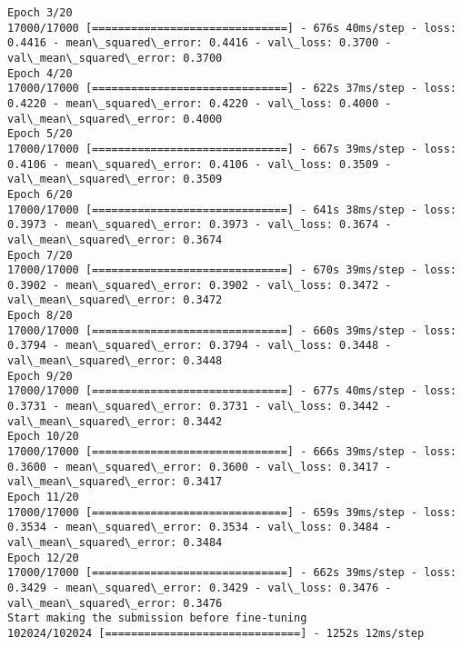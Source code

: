 \documentclass[11pt]{article}
\begin{document}
\begin{Verbatim}[commandchars=\\\{\}]
Epoch 3/20
17000/17000 [==============================] - 676s 40ms/step - loss: 0.4416 - mean\_squared\_error: 0.4416 - val\_loss: 0.3700 - val\_mean\_squared\_error: 0.3700
Epoch 4/20
17000/17000 [==============================] - 622s 37ms/step - loss: 0.4220 - mean\_squared\_error: 0.4220 - val\_loss: 0.4000 - val\_mean\_squared\_error: 0.4000
Epoch 5/20
17000/17000 [==============================] - 667s 39ms/step - loss: 0.4106 - mean\_squared\_error: 0.4106 - val\_loss: 0.3509 - val\_mean\_squared\_error: 0.3509
Epoch 6/20
17000/17000 [==============================] - 641s 38ms/step - loss: 0.3973 - mean\_squared\_error: 0.3973 - val\_loss: 0.3674 - val\_mean\_squared\_error: 0.3674
Epoch 7/20
17000/17000 [==============================] - 670s 39ms/step - loss: 0.3902 - mean\_squared\_error: 0.3902 - val\_loss: 0.3472 - val\_mean\_squared\_error: 0.3472
Epoch 8/20
17000/17000 [==============================] - 660s 39ms/step - loss: 0.3794 - mean\_squared\_error: 0.3794 - val\_loss: 0.3448 - val\_mean\_squared\_error: 0.3448
Epoch 9/20
17000/17000 [==============================] - 677s 40ms/step - loss: 0.3731 - mean\_squared\_error: 0.3731 - val\_loss: 0.3442 - val\_mean\_squared\_error: 0.3442
Epoch 10/20
17000/17000 [==============================] - 666s 39ms/step - loss: 0.3600 - mean\_squared\_error: 0.3600 - val\_loss: 0.3417 - val\_mean\_squared\_error: 0.3417
Epoch 11/20
17000/17000 [==============================] - 659s 39ms/step - loss: 0.3534 - mean\_squared\_error: 0.3534 - val\_loss: 0.3484 - val\_mean\_squared\_error: 0.3484
Epoch 12/20
17000/17000 [==============================] - 662s 39ms/step - loss: 0.3429 - mean\_squared\_error: 0.3429 - val\_loss: 0.3476 - val\_mean\_squared\_error: 0.3476
Start making the submission before fine-tuning
102024/102024 [==============================] - 1252s 12ms/step

    \end{Verbatim}


    
    
    
    
\end{document}
